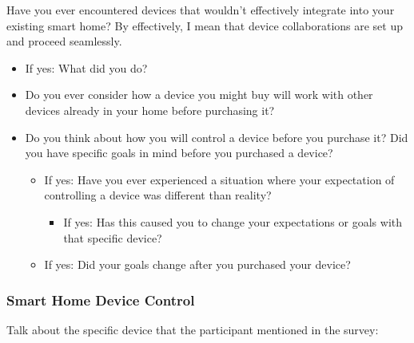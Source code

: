 Have you ever encountered devices that wouldn't effectively integrate into your existing smart home? By effectively, I mean that device collaborations are set up and proceed seamlessly.
\begin{itemize}
    \item If yes: What did you do?
    \item Do you ever consider how a device you might buy will work with other devices already in your home before purchasing it?
    \item Do you think about how you will control a device before you purchase it? Did you have specific goals in mind before you purchased a device?
    \begin{itemize}
        \item If yes: Have you ever experienced a situation where your expectation of controlling a device was different than reality?
        \begin{itemize}
            \item If yes: Has this caused you to change your expectations or goals with that specific device?
        \end{itemize} 
        \item If yes: Did your goals change after you purchased your device?
    \end{itemize}
\end{itemize}

\subsubsection{Smart Home Device Control}
Talk about the specific device that the participant mentioned in the survey:

